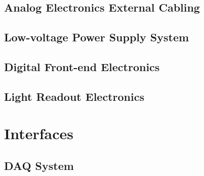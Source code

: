 \subsection{Analog Electronics External Cabling}
\label{sec:fddp-tpc-elec-prod-fecable}

\subsection{Low-voltage Power Supply System}
\label{sec:fddp-tpc-elec-prod-lvps}

\subsection{Digital Front-end Electronics}
\label{sec:fddp-tpc-elec-prod-utca}

\subsection{Light Readout Electronics}
\label{sec:fddp-tpc-elec-prod-lro}








\section{Interfaces}
\label{sec:fddp-tpc-elec-intfc}



\subsection{DAQ System}
\label{sec:fddp-tpc-elec-intfc-daq}

